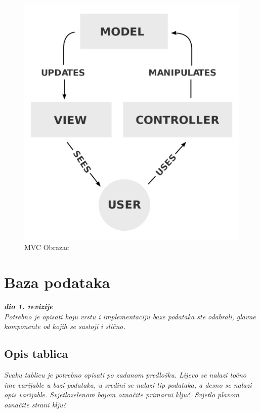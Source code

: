 		\begin{figure}[H]
			\includegraphics[scale=0.2]{slike/MVCObrazac.PNG}
			\centering
			\caption{MVC Obrazac}
			\label{fig:mvc_obrazac}
		\end{figure}

		\eject

				
		\section{Baza podataka}
			
			\textbf{\textit{dio 1. revizije}}\\
			
		\textit{Potrebno je opisati koju vrstu i implementaciju baze podataka ste odabrali, glavne komponente od kojih se sastoji i slično.}
		
			\subsection{Opis tablica}
			

				\textit{Svaku tablicu je potrebno opisati po zadanom predlošku. Lijevo se nalazi točno ime varijable u bazi podataka, u sredini se nalazi tip podataka, a desno se nalazi opis varijable. Svjetlozelenom bojom označite primarni ključ. Svjetlo plavom označite strani ključ}
				
